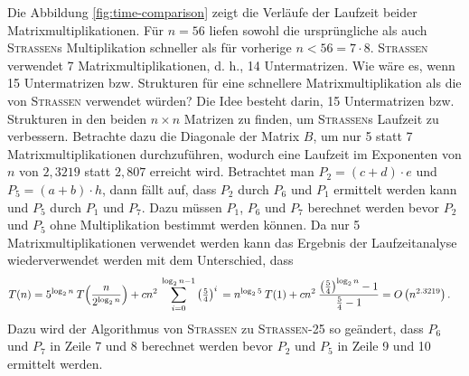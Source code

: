 \documentclass{scrartcl}
\begin{document}
Die Abbildung \ref{fig:time-comparison} zeigt die Verläufe der Laufzeit beider Matrixmultiplikationen. Für $n = 56$ liefen sowohl die ursprüngliche als auch \textsc{Strassen}s Multiplikation schneller als für vorherige $n < 56 = 7 \cdot 8$. \textsc{Strassen} verwendet 7 Matrixmultiplikationen, d. h., 14 Untermatrizen. Wie wäre es, wenn 15 Untermatrizen bzw. Strukturen für eine schnellere Matrixmultiplikation als die von \textsc{Strassen} verwendet würden? Die Idee besteht darin, 15 Untermatrizen bzw. Strukturen in den beiden $n \times n$ Matrizen zu finden, um \textsc{Strassen}s Laufzeit zu verbessern. Betrachte dazu die Diagonale der Matrix $B$, um nur 5 statt 7 Matrixmultiplikationen durchzuführen, wodurch eine Laufzeit im Exponenten von $n$ von $2,3219$ statt $2,807$ erreicht wird. Betrachtet man $P_2 = (c + d) \cdot e$ und $P_5 = (a + b) \cdot h$, dann fällt auf, dass $P_2$ durch $P_6$ und $P_1$ ermittelt werden kann und $P_5$ durch $P_1$ und $P_7$. Dazu müssen $P_1$, $P_6$ und $P_7$ berechnet werden bevor $P_2$ und $P_5$ ohne Multiplikation bestimmt werden können. Da nur 5 Matrixmultiplikationen verwendet werden kann das Ergebnis der Laufzeitanalyse wiederverwendet werden mit dem Unterschied, dass 
\begin{align*}
	\vphantom{\rule{0pt}{2.5ex}} T(n) &= 5^{\log_{2}n} \: T\Big(\frac{n}{2^{\log_{2}n}}\Big) + cn^2 \: \sum_{i = 0}^{\log_{2}n-1} \left(\tfrac{5}{4}\right)^i
	\vphantom{\rule{0pt}{2.5ex}} = n^{\log_{2}5} \: T(1) + cn^2 \:\frac{\left(\tfrac{5}{4}\right)^{\log_{2}n} - 1}{\tfrac{5}{4} - 1}
	\vphantom{\rule{0pt}{2.5ex}} = O\left(n^{2.3219}\right).
\end{align*}
Dazu wird der Algorithmus von \textsc{Strassen} zu \textsc{Strassen-25} so geändert, dass $P_6$ und $P_7$ in Zeile 7 und 8 berechnet werden bevor $P_2$ und $P_5$ in Zeile 9 und 10 ermittelt werden.
\end{document}
